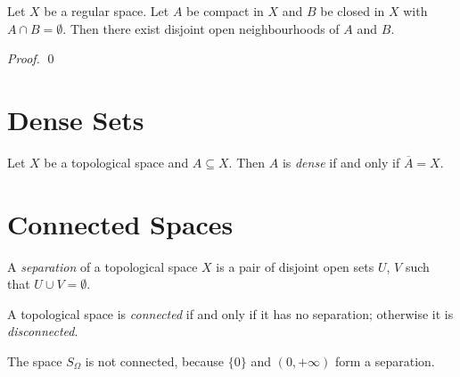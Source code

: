 \begin{proposition}
    \label{proposition:regular_space_compact_closed}
    Let $X$ be a regular space. Let $A$ be compact in $X$ and $B$ be
    closed in $X$ with $A \cap B = \emptyset$. Then there exist
    disjoint open neighbourhoods of $A$ and $B$.
\end{proposition}

\begin{proof}
    \pf
    \qed
\end{proof}

\section{Dense Sets}

\begin{definition}[Dense]
    Let $X$ be a topological space and $A \subseteq X$. Then $A$ is \emph{dense}
    if and only if $\overline{A} = X$.
\end{definition}

\section{Connected Spaces}

\begin{definition}[Separation]
    A \emph{separation} of a topological space $X$ is a pair of disjoint open sets $U$, $V$ such that $U \cup V = \emptyset$.
\end{definition}

\begin{definition}[Connected]
    A topological space is \emph{connected} if and only if it has no separation; otherwise it is \emph{disconnected}.
\end{definition}

\begin{example}
    The space $S_\Omega$ is not connected, because $\{0\}$ and $(0, +\infty)$ form a separation.
\end{example}


